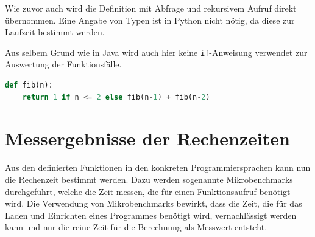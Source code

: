 \documentclass[11pt, parskip=half]{scrartcl}       %
\begin{document}
Wie zuvor auch wird die Definition mit Abfrage und rekursivem Aufruf direkt übernommen.
Eine Angabe von Typen ist in Python nicht nötig, da diese zur Laufzeit bestimmt werden.

Aus selbem Grund wie in Java wird auch hier keine \texttt{if}-Anweisung verwendet zur Auswertung der Funktionsfälle.

\begin{lstlisting}[language=python]
  def fib(n):
	return 1 if n <= 2 else fib(n-1) + fib(n-2)
\end{lstlisting}


\section{Messergebnisse der Rechenzeiten}

Aus den definierten Funktionen in den konkreten Programmiersprachen kann nun die Rechenzeit bestimmt werden.
Dazu werden sogenannte Mikrobenchmarks durchgeführt, welche die Zeit messen, die für einen Funktionsaufruf benötigt wird.
Die Verwendung von Mikrobenchmarks bewirkt, dass die Zeit, die für das Laden und Einrichten eines Programmes benötigt wird, vernachlässigt werden kann und nur die reine Zeit für die Berechnung als Messwert entsteht.
\end{document}
